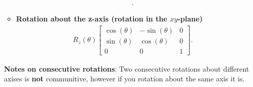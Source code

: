 \documentclass{report}
\begin{document}
\begin{itemize}
\begin{itemize}
\begin{align*}
                    .\end{align*}
                \item \textbf{Rotation about the z-axis (rotation in the $xy$-plane)}
                    \begin{align*}
                        R_{z}(\theta ) \begin{bmatrix} \cos{\left(\theta \right)} & -\sin{\left(\theta \right)} & 0 \\ \sin{\left(\theta \right)} & \cos{\left(\theta \right)} & 0 \\ 0 & 0 & 1\end{bmatrix}
                    .\end{align*}
            \end{itemize}
            \bigbreak \noindent 
            \textbf{Notes on consecutive rotations}: Two consecutive rotations about different axises is \textbf{not} communitive, however if you rotation about the same axis it is.
    \end{itemize}

    \pagebreak 
    \begin{itemize}
    \end{itemize}





    
\end{document}
